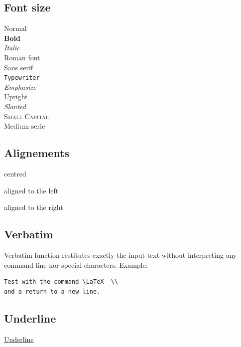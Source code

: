 \documentclass{article}
\begin{document}
\subsection{Font size} 

\normalsize %

\textnormal{Normal}   \\ 
\textbf{Bold}   \\ 
\textit{Italic}  \\ 
\textrm{Roman font}  \\ 
\textsf{Sans serif}   \\ 
\texttt{Typewriter}   \\ 
\emph{Emphasize}  \\ 
\textup{Upright}  \\ 
\textsl{Slanted}  \\ 
\textsc{Small Capital }  \\ 
\textmd{Medium serie}   \\ 



\subsection{Alignements} 

\begin{center} centred \end{center}     
 
 \begin{flushleft}  aligned to the left \end{flushleft}  
 
 \begin{flushright} aligned to the right  \end{flushright}  


\subsection{Verbatim}

Verbatim function restitutes exactly the input text without interpreting any command line nor special characters.  Example: 

\begin{verbatim}
Test with the command \LaTeX  \\ 
and a return to a new line. 
\end{verbatim}


\subsection{Underline}
\underline{Underline}
\end{document}
